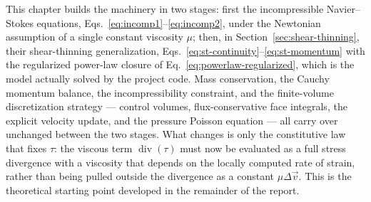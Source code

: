 \documentclass[11pt]{article}
\newcommand{\vv}{\vec{v}}
\begin{document}
This chapter builds the machinery in two stages: first the incompressible Navier--Stokes equations, Eqs.~\eqref{eq:incomp1}--\eqref{eq:incomp2}, under the Newtonian assumption of a single constant viscosity $\mu$; then, in Section~\ref{sec:shear-thinning}, their shear-thinning generalization, Eqs.~\eqref{eq:st-continuity}--\eqref{eq:st-momentum} with the regularized power-law closure of Eq.~\eqref{eq:powerlaw-regularized}, which is the model actually solved by the project code. Mass conservation, the Cauchy momentum balance, the incompressibility constraint, and the finite-volume discretization strategy — control volumes, flux-conservative face integrals, the explicit velocity update, and the pressure Poisson equation — all carry over unchanged between the two stages. What changes is only the constitutive law that fixes $\tau$: the viscous term $\operatorname{div}(\tau)$ must now be evaluated as a full stress divergence with a viscosity that depends on the locally computed rate of strain, rather than being pulled outside the divergence as a constant $\mu\Delta\vv$. This is the theoretical starting point developed in the remainder of the report.
\end{document}
